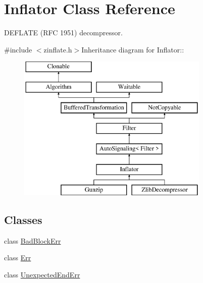 \hypertarget{class_inflator}{
\section{Inflator Class Reference}
\label{class_inflator}
}


DEFLATE (RFC 1951) decompressor.  


{\ttfamily \#include $<$zinflate.h$>$}Inheritance diagram for Inflator::\begin{figure}[H]
\begin{center}
\leavevmode
\includegraphics[height=7cm]{class_inflator}
\end{center}
\end{figure}
\subsection*{Classes}
\begin{DoxyCompactItemize}
\item 
class \hyperlink{class_inflator_1_1_bad_block_err}{BadBlockErr}
\item 
class \hyperlink{class_inflator_1_1_err}{Err}
\item 
class \hyperlink{class_inflator_1_1_unexpected_end_err}{UnexpectedEndErr}
\end{DoxyCompactItemize}

